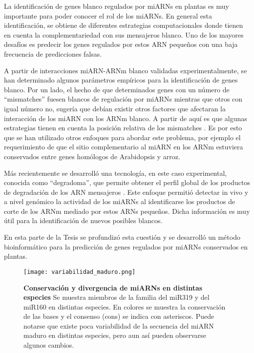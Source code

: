 La identificación de genes blanco regulados por miARNs en plantas es muy importante para poder conocer el rol de los miARNs.
En general esta identificación, se obtiene de diferentes estrategias computacionales donde tienen en cuenta la complementariedad con sus mensajeros blanco.
Uno de los mayores desafíos es predecir los genes regulados por estos ARN pequeños con una baja frecuencia de predicciones falsas.

A partir de interacciones miARN-ARNm blanco validadas experimentalmente, se han determinado algunos parámetros empíricos para la identificación de genes blanco.
Por un lado, el hecho de que determinados genes con un número de ``mismatches'' fuesen blancos de regulación por miARNs mientras que otros con igual número no, sugería que debían existir otros factores que afectaran la interacción de los miARN con los ARNm blanco.
A partir de aquí es que algunas estrategias tienen en cuenta la posición relativa de los mismatches \citep{Schwab2005517}.
Es por esto que se han utilizado otros enfoques para abordar este problema, por ejemplo el requerimiento de que el sitio complementario al miARN en los ARNm estuviera conservados entre genes homólogos de Arabidopsis y arroz.

Más recientemente se desarrolló una tecnología, en este caso experimental, conocida como ``degradoma'', que permite obtener el perfil global de los productos de degradación de los ARN mensajeros \citep{German2008,pmid18472421}.
Este enfoque permitió detectar in vivo y a nivel genómico la actividad de los miARNs al identificarse los productos de corte de los ARNm mediado por estos ARNs pequeños.
Dicha información es muy útil para la identificación de nuevos posibles blancos.

En esta parte de la Tesis se profundizó esta cuestión y se desarrolló un método bioinformático para la predicción de genes regulados por miARNs conservados en plantas.

\begin{figure}[htbp!] 
    \centering    
    \texttt{[image: variabilidad\_maduro.png]}
    \caption[Conservación y divergencia de miARNs en distintas especies]{
    \textbf{Conservación y divergencia de miARNs en distintas especies}
    Se muestra miembros de la familia del miR319 y del miR160 en distintas especies. 
    En colores se muestra la conservación de las bases  y el consenso (cons) se indica con asteriscos.
    Puede notarse que existe poca variabilidad de la secuencia del miARN maduro en distintas especies, pero aun así pueden observarse algunos cambios. 
		}
    \label{fig:variabilidad_maduro}
\end{figure}



